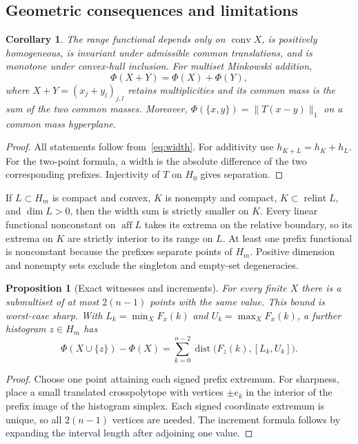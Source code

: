 \documentclass[11pt]{article}
\newtheorem{proposition}[theorem]{Proposition}
\newtheorem{corollary}[theorem]{Corollary}
\theoremstyle{definition}\newtheorem{definition}[theorem]{Definition}
\newcommand{\1}{\mathbf 1}
\newcommand{\conv}{\operatorname{conv}}
\newcommand{\aff}{\operatorname{aff}}
\newcommand{\relint}{\operatorname{relint}}
\begin{document}
\subsection{Geometric consequences and limitations}
\begin{corollary}\label{cor:geometry}
The range functional depends only on $\conv X$, is positively homogeneous,
is invariant under admissible common translations, and is monotone under
convex-hull inclusion. For multiset Minkowski addition,
\[
 \Phi(X+Y)=\Phi(X)+\Phi(Y),
\]
where $X+Y=(x_j+y_l)_{j,l}$ retains multiplicities and its common mass is the
sum of the two common masses. Moreover,
$\Phi(\{x,y\})=\|T(x-y)\|_1$ on a common mass hyperplane.
\end{corollary}
\begin{proof}
All statements follow from~\eqref{eq:width}. For additivity use
$h_{K+L}=h_K+h_L$. For the two-point formula, a width is the absolute difference
of the two corresponding prefixes. Injectivity of $T$ on $H_0$ gives separation.
\end{proof}

If $L\subset H_m$ is compact and convex, $K$ is nonempty and compact,
$K\subset\relint L$, and $\dim L>0$, then the
width sum is strictly smaller on $K$. Every linear functional nonconstant on
$\aff L$ takes its extrema on the relative boundary, so its extrema on $K$ are
strictly interior to its range on $L$. At least one prefix functional is
nonconstant because the prefixes separate points of $H_m$. Positive dimension
and nonempty sets exclude the singleton and empty-set degeneracies.

\begin{proposition}[Exact witnesses and increments]\label{prop:witness}
For every finite $X$ there is a submultiset of at most $2(n-1)$ points with the
same value. This bound is worst-case sharp. With
$L_k=\min_X F_x(k)$ and $U_k=\max_X F_x(k)$, a further histogram $z\in H_m$ has
\[
 \Phi(X\cup\{z\})-\Phi(X)
 =\sum_{k=0}^{n-2}\operatorname{dist}\bigl(F_z(k),[L_k,U_k]\bigr).
\]
\end{proposition}
\begin{proof}
Choose one point attaining each signed prefix extremum. For sharpness, place a
small translated crosspolytope with vertices $\pm e_k$ in the interior of the
prefix image of the histogram simplex. Each signed coordinate extremum is
unique, so all $2(n-1)$ vertices are needed. The increment formula follows by
expanding the interval length after adjoining one value.
\end{proof}
\end{document}
